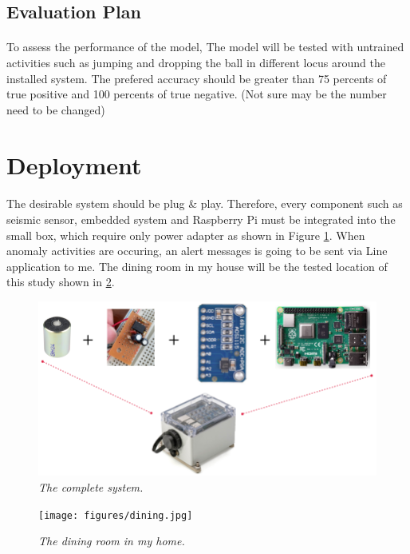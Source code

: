 
\subsection{Evaluation Plan}
\paragraph{}
To assess the performance of the model, The model will be tested with untrained activities such as jumping and dropping the ball in different locus around the installed system. The prefered accuracy should be greater than 75 percents of true positive and 100 percents of true negative. (Not sure may be the number need to be changed)

\section{Deployment}
\paragraph{}
The desirable system should be plug \& play. Therefore, every component such as seismic sensor, embedded system and Raspberry Pi must be integrated into the small box, which require only power adapter as shown in Figure \ref{fig:application}. When anomaly activities are occuring, an alert messages is going to be sent via Line application to me. The dining room in my house will be the tested location of this study shown in \ref{fig:dining}.

\begin{figure}[H]
  \centering
  \caption[The complete application.]{\emph{The complete system.}} \label{fig:application}
  \includegraphics[scale = 0.5]{figures/application.png}  
\end{figure}

\begin{figure}[H]
  \centering
  \caption[The dining room in my home.]{\emph{The dining room in my home.}} \label{fig:dining}
  \texttt{[image: figures/dining.jpg]}  
\end{figure}

\FloatBarrier